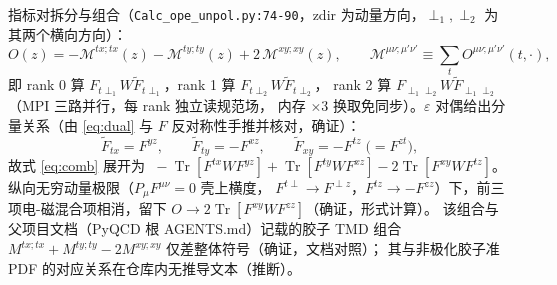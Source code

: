 \documentclass[UTF8]{ctexart}
\begin{document}
指标对拆分与组合（\texttt{\nolinkurl{Calc_ope_unpol.py:74-90}}，zdir 为动量方向，$\perp_1,\perp_2$
为其两个横向方向）：
\begin{equation}\label{eq:comb}
O(z)=-\mathcal{M}^{tx;tx}(z)-\mathcal{M}^{ty;ty}(z)+2\,\mathcal{M}^{xy;xy}(z),
\qquad \mathcal{M}^{\mu\nu;\mu'\nu'}\equiv\sum_t O^{\mu\nu;\mu'\nu'}(t,\cdot),
\end{equation}
即 rank 0 算 $F_{t\perp_1}W\tilde F_{t\perp_1}$，rank 1 算 $F_{t\perp_2}W\tilde F_{t\perp_2}$，
rank 2 算 $F_{\perp_1\perp_2}W\tilde F_{\perp_1\perp_2}$（MPI 三路并行，每 rank 独立读规范场，
内存 $\times3$ 换取免同步）。$\varepsilon$ 对偶给出分量关系（由 \eqref{eq:dual} 与 $F$
反对称性手推并核对，\textcolor{accent}{确证}）：
\begin{equation}\label{eq:dualrel}
\tilde F_{tx}=F^{yz},\qquad \tilde F_{ty}=-F^{xz},\qquad \tilde F_{xy}=-F^{tz}\;\big(=F^{zt}\big),
\end{equation}
故式 \eqref{eq:comb} 展开为 $\;-\operatorname{Tr}[F^{tx}WF^{yz}]+\operatorname{Tr}[F^{ty}WF^{xz}]
-2\operatorname{Tr}[F^{xy}WF^{tz}]$。纵向无穷动量极限（$P_\mu F^{\mu\nu}=0$ 壳上横度，
$F^{t\perp}\to F^{\perp z}$，$F^{tz}\to -F^{zz}$）下，前三项电-磁混合项相消，留下
$O\to 2\operatorname{Tr}[F^{xy}WF^{zz}]$（\textcolor{accent}{确证}，形式计算）。
该组合与父项目文档（PyQCD 根 AGENTS.md）记载的胶子 TMD 组合
$M^{tx;tx}+M^{ty;ty}-2M^{xy;xy}$ 仅差整体符号（\textcolor{accent}{确证}，文档对照）；
其与非极化胶子准 PDF 的对应关系在仓库内无推导文本（\textcolor{phys}{推断}）。
\end{document}
